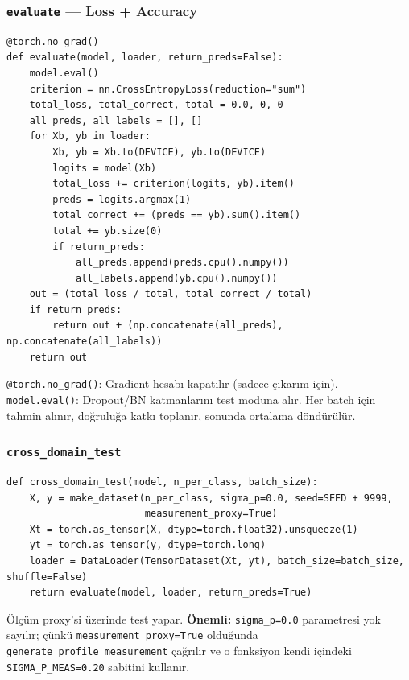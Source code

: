 \documentclass[11pt,a4paper]{article}
\begin{document}
\subsubsection{\texttt{evaluate} — Loss + Accuracy}
\begin{lstlisting}
@torch.no_grad()
def evaluate(model, loader, return_preds=False):
    model.eval()
    criterion = nn.CrossEntropyLoss(reduction="sum")
    total_loss, total_correct, total = 0.0, 0, 0
    all_preds, all_labels = [], []
    for Xb, yb in loader:
        Xb, yb = Xb.to(DEVICE), yb.to(DEVICE)
        logits = model(Xb)
        total_loss += criterion(logits, yb).item()
        preds = logits.argmax(1)
        total_correct += (preds == yb).sum().item()
        total += yb.size(0)
        if return_preds:
            all_preds.append(preds.cpu().numpy())
            all_labels.append(yb.cpu().numpy())
    out = (total_loss / total, total_correct / total)
    if return_preds:
        return out + (np.concatenate(all_preds), np.concatenate(all_labels))
    return out
\end{lstlisting}
\texttt{@torch.no\_grad()}: Gradient hesabı kapatılır (sadece çıkarım için).
\texttt{model.eval()}: Dropout/BN katmanlarını test moduna alır.
Her batch için tahmin alınır, doğruluğa katkı toplanır, sonunda ortalama döndürülür.

\subsubsection{\texttt{cross\_domain\_test}}
\begin{lstlisting}
def cross_domain_test(model, n_per_class, batch_size):
    X, y = make_dataset(n_per_class, sigma_p=0.0, seed=SEED + 9999,
                        measurement_proxy=True)
    Xt = torch.as_tensor(X, dtype=torch.float32).unsqueeze(1)
    yt = torch.as_tensor(y, dtype=torch.long)
    loader = DataLoader(TensorDataset(Xt, yt), batch_size=batch_size, shuffle=False)
    return evaluate(model, loader, return_preds=True)
\end{lstlisting}
Ölçüm proxy'si üzerinde test yapar. \textbf{Önemli:} \texttt{sigma\_p=0.0} parametresi yok sayılır;
çünkü \texttt{measurement\_proxy=True} olduğunda \texttt{generate\_profile\_measurement} çağrılır
ve o fonksiyon kendi içindeki \texttt{SIGMA\_P\_MEAS=0.20} sabitini kullanır.
\end{document}
